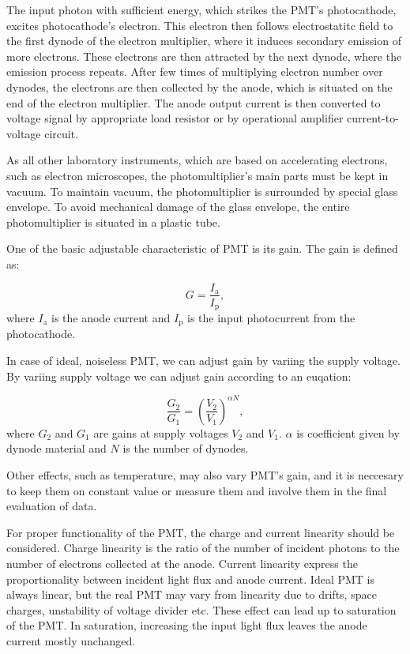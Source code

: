 \par
The input photon with sufficient energy, which strikes the PMT's photocathode, excites photocathode's electron. This electron then follows electrostatitc field to the first dynode of the electron multiplier, where it induces secondary emission of more electrons. These electrons are then attracted by the next dynode, where the emission process repeats. After few times of multiplying electron number over dynodes, the electrons are then collected by 
the anode, which is situated on the end of the electron multiplier. The anode output current is then converted to voltage signal by appropriate load resistor or by operational amplifier current-to-voltage circuit.
\par
As all other laboratory instruments, which are based on accelerating electrons, such as electron microscopes, the photomultiplier's main parts must be kept in vacuum. To maintain vacuum, the photomultiplier is surrounded by special glass envelope. To avoid mechanical damage of the glass envelope, the entire photomultiplier is situated in a plastic tube.
\par
One of the basic adjustable characteristic of PMT is its gain. The gain is defined as:

\begin{equation}
G = \frac{I_\textrm{a}}{I_\textrm{p}},
\end{equation}
where $I_\textrm{a}$ is the anode current and $I_\textrm{p}$ is the input photocurrent from the photocathode.
\par
In case of ideal, noiseless PMT, we can adjust gain by variing the supply voltage. By variing supply voltage we can adjust gain according to an euqation:

\begin{equation}
\frac{G_2}{G_1} = (\frac{V_2}{V_1})^{\alpha N},
\label{gainVolt}
\end{equation}
where $G_2$ and $G_1$ are gains at supply voltages $V_2$ and $V_1$. $\alpha$ is coefficient given by dynode material and $N$ is the number of dynodes.
\par
Other effects, such as temperature, may also vary PMT's gain, and it is neccesary to keep them on constant value or measure them and involve them in the final evaluation of data.
\par
For proper functionality of the PMT, the charge and current linearity should be considered. Charge linearity is the ratio of the number of incident photons to the number of electrons collected at the anode. Current linearity express the proportionality between incident light flux and anode current. Ideal PMT is always linear, but the real PMT may vary from linearity due to drifts, space charges, unstability of voltage divider etc. These effect can lead up to saturation of the PMT. In saturation, increasing the input light flux leaves the anode current mostly unchanged.      


